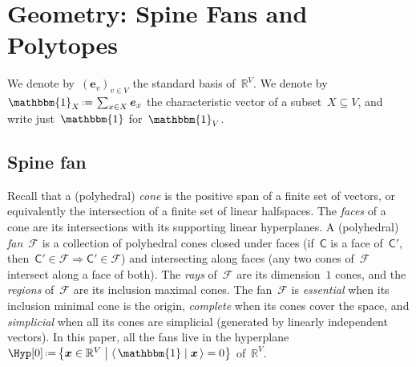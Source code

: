 \documentclass{amsart}
\theoremstyle{definition}
\newcommand{\R}{\mathbb{R}} %
\renewcommand{\c}[1]{{\mathcal{#1}}} %
\renewcommand{\b}[1]{{\boldsymbol{#1}}} %
\newcommand{\bigset}[2]{\big\{ #1 \;\big|\; #2 \big\}} %
\newcommand{\dotprod}[2]{\langle \, #1 \; | \; #2 \, \rangle} %
\newcommand{\one}{\mathbbm{1}} %
\newcommand{\eqdef}{\mbox{\,\raisebox{0.2ex}{\scriptsize\ensuremath{\mathrm:}}\ensuremath{=}\,}} %
\newcommand{\eg}{\textit{e.g.}~} %
\newcommand{\darkblue}{\color{darkblue}} %
\newcommand{\defn}[1]{\textsl{\darkblue #1}} %
\newcommand{\vertexSet}{V}
\newcommand{\polytope}[1]{\mathsf{#1}} %
\newcommand{\weight}{\omega} %
\begin{document}

\section{Geometry: Spine Fans and Polytopes}

We denote by~$(\b{e}_v)_{v \in \vertexSet}$ the standard basis of~$\R^{\vertexSet}$.
We denote by~$\one_X \eqdef \sum_{x \in X} \b{e}_x$ the characteristic vector of a subset~$X \subseteq \vertexSet$, and write just~$\one$ for~$\one_{\vertexSet}$.


\subsection{Spine fan}

%
Recall that a (polyhedral) \defn{cone} is the positive span of a finite set of vectors, or equivalently the intersection of a finite set of linear halfspaces.
The \defn{faces} of a cone are its intersections with its supporting linear hyperplanes.
A (polyhedral) \defn{fan}~$\c{F}$ is a collection of polyhedral cones closed under faces (if~$\polytope{C}$ is a face of~$\polytope{C'}$, then~$\polytope{C'} \in \c{F} \Rightarrow \polytope{C'} \in \c{F}$) and intersecting along faces (any two cones of~$\c{F}$ intersect along a face of both).
The \defn{rays} of~$\c{F}$ are its dimension~$1$ cones, and the \defn{regions} of~$\c{F}$ are its inclusion maximal cones.
The fan~$\c{F}$ is \defn{essential} when its inclusion minimal cone is the origin, \defn{complete} when its cones cover the space, and \defn{simplicial} when all its cones are simplicial (generated by linearly independent vectors).
In this paper, all the fans live in the hyperplane~${\Hyp[0] \eqdef \bigset{\b{x} \in \R^{\vertexSet}}{\dotprod{\one}{\b{x}} = 0}}$ of~$\R^{\vertexSet}$.
\end{document}
